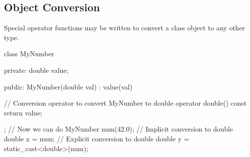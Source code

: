 \documentclass{report}
\begin{document}
    \bigbreak \noindent 
    \subsection{Object Conversion}
    \bigbreak \noindent 
    \begin{concept}
        Special operator functions may be written to convert a class object to any other type.
    \end{concept}
    \bigbreak \noindent 
    \begin{cppcode}
        class MyNumber {
        private:
            double value;

        public:
            MyNumber(double val) : value(val) {}

            // Conversion operator to convert MyNumber to double
            operator double() const {
                return value;
            }
        };
        // Now we can do
        MyNumber num(42.0);
        // Implicit conversion to double
        double x = num;
        // Explicit conversion to double
        double y = static_cast<double>(num);
    \end{cppcode}
    
\end{document}
